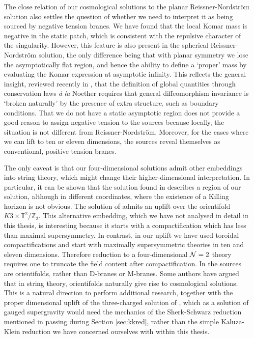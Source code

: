 The close relation of our cosmological solutions to the planar Reissner-Nordstr\"om solution also settles the question of whether we need to interpret it as being sourced by negative tension branes. We have found that the local Komar mass is negative in the static patch, which is consistent with the repulsive character of the singularity. However, this feature is also present in the spherical Reissner-Nordstr\"om solution, the only difference being that with planar symmetry we lose the asymptotically flat region, and hence the ability to define a `proper' mass by evaluating the Komar expression at asymptotic infinity. This reflects the general insight, reviewed recently in \cite{Deser:2019acl}, that the definition of global quantities through conservation laws \emph{\`a la} Noether requires that general diffeomorphism invariance is `broken naturally' by the presence of extra structure, such as boundary conditions. That we do not have a static asymptotic region does not provide a good reason to assign negative tension to the sources because locally, the situation is not different from Reissner-Nordstr\"om. Moreover, for the cases where we can lift to ten or eleven dimensions, the sources reveal themselves as conventional, positive tension branes.

The only caveat is that our four-dimensional solutions admit other embeddings into string theory, which might change their higher-dimensional interpretation. In particular, it can be shown that the solution found in \cite{Fre:2008zd} describes a region of our solution, although in different coordinates, where the existence of a Killing horizon is not obvious. The solution of \cite{Fre:2008zd} admits an uplift over the orientifold $K3 \times \mathbb{T}^2 / \mathbb{Z}_2$. This alternative embedding, which we have not analysed in detail in this thesis, is interesting because it starts with a compactification which has less than maximal supersymmetry. In contrast, in our uplift we have used toroidal compactifications and start with maximally supersymmetric theories in ten and eleven dimensions. Therefore reduction to a four-dimensional ${\cal N}=2$ theory requires one to truncate the field content after compactification. In \cite{Fre:2008zd} the sources are orientifolds, rather than D-branes or M-branes. Some authors \cite{Cornalba:2003kd} have argued that in string theory, orientifolds naturally give rise to cosmological solutions. This is a natural direction to perform additional research, together with the proper dimensional uplift of the three-charged solution of \cite{Gutowski:2019iyo}, which as a solution of gauged supergravity would need the mechanics of the Sherk-Schwarz reduction mentioned in passing during Section \ref{sec:kkred}, rather than the simple Kaluza-Klein reduction we have concerned ourselves with within this thesis.

